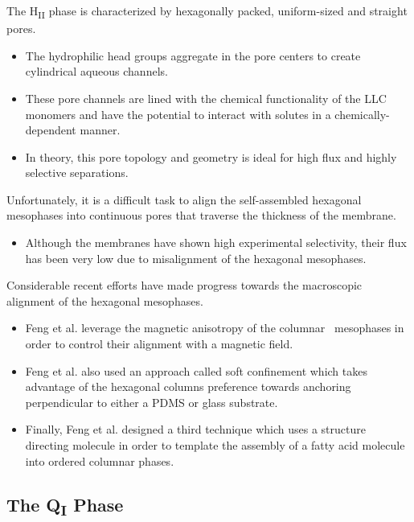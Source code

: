   The H\textsubscript{II} phase is characterized by hexagonally packed, uniform-sized
  and straight pores.
  \begin{itemize}
    \item The hydrophilic head groups aggregate in the pore centers to create
    cylindrical aqueous channels. 
    \item These pore channels are lined with the chemical functionality of the LLC monomers
    and have the potential to interact with solutes in a chemically-dependent manner.
    \item In theory, this pore topology and geometry is ideal for high flux and 
    highly selective separations.
  \end{itemize}
  
  Unfortunately, it is a difficult task to align the self-assembled hexagonal
  mesophases into continuous pores that traverse the thickness of the membrane.
  \begin{itemize}
    \item Although the membranes have shown high experimental selectivity, their 
    flux has been very low due to misalignment of the hexagonal mesophases.
  \end{itemize}
  
  Considerable recent efforts have made progress towards the macroscopic
  alignment of the hexagonal mesophases.
  \begin{itemize}
    \item Feng et al. leverage the magnetic anisotropy of the columnar \
    mesophases in order to control their alignment with a magnetic field.~\cite{feng_scalable_2014}
    \item Feng et al. also used an approach called soft confinement which
    takes advantage of the hexagonal columns preference towards anchoring
    perpendicular to either a PDMS or glass substrate.~\cite{feng_thin_2016}
    \item Finally, Feng et al. designed a third technique which uses a structure
    directing molecule in order to template the assembly of a fatty acid 
    molecule into ordered columnar phases.~\cite{feng_highly_2017}
  \end{itemize}
  
  \subsection{The Q\textsubscript{I} Phase}
  
